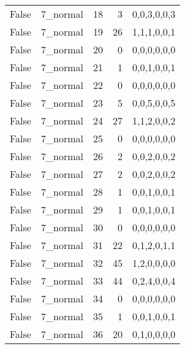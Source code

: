 \begin{tabular}{llrrl}
 False           & 7\_normal            &            18 &                     3 & 0,0,3,0,0,3   \\
 False           & 7\_normal            &            19 &                    26 & 1,1,1,0,0,1   \\
 False           & 7\_normal            &            20 &                     0 & 0,0,0,0,0,0   \\
 False           & 7\_normal            &            21 &                     1 & 0,0,1,0,0,1   \\
 False           & 7\_normal            &            22 &                     0 & 0,0,0,0,0,0   \\
 False           & 7\_normal            &            23 &                     5 & 0,0,5,0,0,5   \\
 False           & 7\_normal            &            24 &                    27 & 1,1,2,0,0,2   \\
 False           & 7\_normal            &            25 &                     0 & 0,0,0,0,0,0   \\
 False           & 7\_normal            &            26 &                     2 & 0,0,2,0,0,2   \\
 False           & 7\_normal            &            27 &                     2 & 0,0,2,0,0,2   \\
 False           & 7\_normal            &            28 &                     1 & 0,0,1,0,0,1   \\
 False           & 7\_normal            &            29 &                     1 & 0,0,1,0,0,1   \\
 False           & 7\_normal            &            30 &                     0 & 0,0,0,0,0,0   \\
 False           & 7\_normal            &            31 &                    22 & 0,1,2,0,1,1   \\
 False           & 7\_normal            &            32 &                    45 & 1,2,0,0,0,0   \\
 False           & 7\_normal            &            33 &                    44 & 0,2,4,0,0,4   \\
 False           & 7\_normal            &            34 &                     0 & 0,0,0,0,0,0   \\
 False           & 7\_normal            &            35 &                     1 & 0,0,1,0,0,1   \\
 False           & 7\_normal            &            36 &                    20 & 0,1,0,0,0,0   \\

\end{tabular}

